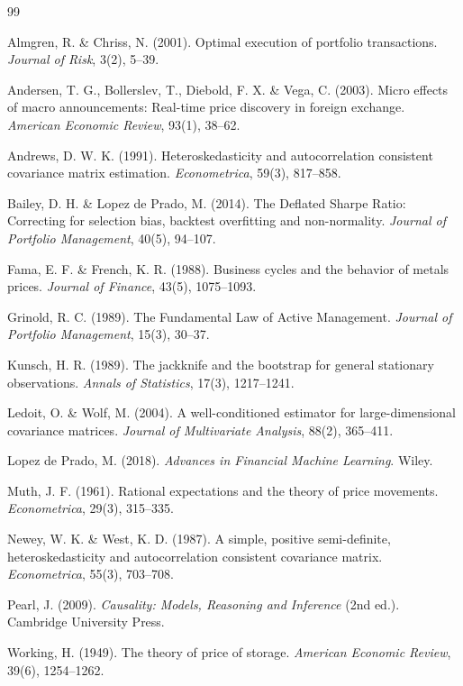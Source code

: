 \documentclass[11pt]{article}
\begin{document}
\begin{thebibliography}{99}

 Almgren, R. \& Chriss, N. (2001). Optimal execution of portfolio transactions. \textit{Journal of Risk}, 3(2), 5--39.

 Andersen, T. G., Bollerslev, T., Diebold, F. X. \& Vega, C. (2003). Micro effects of macro announcements: Real-time price discovery in foreign exchange. \textit{American Economic Review}, 93(1), 38--62.

 Andrews, D. W. K. (1991). Heteroskedasticity and autocorrelation consistent covariance matrix estimation. \textit{Econometrica}, 59(3), 817--858.

 Bailey, D. H. \& Lopez de Prado, M. (2014). The Deflated Sharpe Ratio: Correcting for selection bias, backtest overfitting and non-normality. \textit{Journal of Portfolio Management}, 40(5), 94--107.

 Fama, E. F. \& French, K. R. (1988). Business cycles and the behavior of metals prices. \textit{Journal of Finance}, 43(5), 1075--1093.

 Grinold, R. C. (1989). The Fundamental Law of Active Management. \textit{Journal of Portfolio Management}, 15(3), 30--37.

 Kunsch, H. R. (1989). The jackknife and the bootstrap for general stationary observations. \textit{Annals of Statistics}, 17(3), 1217--1241.

 Ledoit, O. \& Wolf, M. (2004). A well-conditioned estimator for large-dimensional covariance matrices. \textit{Journal of Multivariate Analysis}, 88(2), 365--411.

 Lopez de Prado, M. (2018). \textit{Advances in Financial Machine Learning}. Wiley.

 Muth, J. F. (1961). Rational expectations and the theory of price movements. \textit{Econometrica}, 29(3), 315--335.

 Newey, W. K. \& West, K. D. (1987). A simple, positive semi-definite, heteroskedasticity and autocorrelation consistent covariance matrix. \textit{Econometrica}, 55(3), 703--708.

 Pearl, J. (2009). \textit{Causality: Models, Reasoning and Inference} (2nd ed.). Cambridge University Press.

 Working, H. (1949). The theory of price of storage. \textit{American Economic Review}, 39(6), 1254--1262.

\end{thebibliography}
\end{document}
